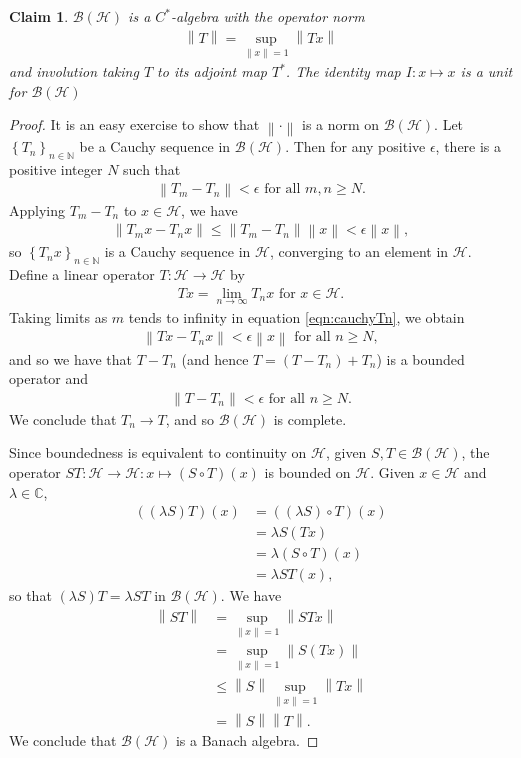 \documentclass[11pt,a4paper]{report}
\theoremstyle{plain}
\newtheorem*{claim}{Claim}
\theoremstyle{definition}
\newcommand{\1}{\mathbbm{1}}
\newcommand{\C}{\mathbb{C}}
\newcommand{\N}{\mathbb{N}}
\renewcommand{\H}{\mathcal{H}}
\newcommand{\B}{\mathcal{B}}
\newcommand{\BH}{\mathcal{\B(\H)}}
\begin{document}
\begin{claim} 
	$\B(\H)$ is a $C^\ast$-algebra with the operator norm 
	\begin{align*}
		\left\|T\right\|= \sup_{\left\|x\right\|=1}{\left\|Tx\right\|}
	\end{align*}
	and involution taking $T$ to its adjoint map $T^\ast$. 
	The identity map $I:x\mapsto x$ is a unit for $\BH$
\end{claim}
\begin{proof}
	It is an easy exercise to show that $\left\|\cdot\right\|$ is a norm on $\BH$. 
	Let $\left\{T_n\right\}_{n\in\N}$ be a Cauchy sequence in $\BH$. Then for any 
	positive $\epsilon$, there is a positive integer $N$ such that 
	\begin{align*}
		\left\|T_m-T_n\right\| < \epsilon \mbox{ for all } m,n \geq N.
	\end{align*}
	Applying $T_m-T_n$ to $x \in \H$, we have 
	\begin{align}\label{eqn:cauchyTn}
		\left\|T_mx-T_nx\right\| 	\leq \left\|T_m-T_n\right\| \left\|x\right\| 
									< \epsilon \left\|x\right\|,
	\end{align}
	so $\left\{T_n x\right\}_{n\in\N}$ is a Cauchy sequence in $\H$, converging to 
	an element in $\H$. Define a linear operator $T:\H \to \H$ by 
	\begin{align*}
		Tx= \lim_{n\to\infty}{T_nx} \mbox{ for } x \in \H.
	\end{align*}
	Taking limits as $m$ tends to infinity in equation \eqref{eqn:cauchyTn}, we obtain
	\begin{align*}
		\left\|Tx-T_nx\right\| < \epsilon \left\|x\right\| \mbox{ for all }n \geq N,
	\end{align*}
	and so we have that $T-T_n$ (and hence $T=(T-T_n)+T_n$) is a bounded operator and  
	\begin{align*}
		\left\|T-T_n\right\| <\epsilon \mbox{ for all }n \geq N.
	\end{align*}
	We conclude that $T_n \to T$, and so $\BH$ is complete.
	
	Since boundedness is equivalent to continuity on $\H$, given $S,T\in\BH$, the 
	operator $ST:\H \to \H: x \mapsto (S\circ T)(x)$ is bounded on $\H$. Given 
	$x\in\H$ and $\lambda\in\C$, 
	\begin{align*}
			((\lambda S)T)(x)
		&=	((\lambda S)\circ T)(x)															\\
		&=	\lambda S(Tx)																	\\
		&=	\lambda (S\circ T)(x)															\\
		&=	\lambda ST(x),		
	\end{align*} 
	so that $(\lambda S)T = \lambda ST$ in $\BH$. We have 
	\begin{align*}
				\left\|ST\right\|
		&=		\sup_{\left\|x\right\|=1}{\left\|STx\right\|} 								\\
		&=		\sup_{\left\|x\right\|=1}{\left\|S(Tx)\right\|} 							\\
		&\leq	\left\|S\right\| \sup_{\left\|x\right\|=1}{\left\|Tx\right\|} 				\\
		&=		\left\|S\right\| \left\|T\right\|.
	\end{align*}
	We conclude that $\BH$ is a Banach algebra.
	

\end{proof}
\end{document}
